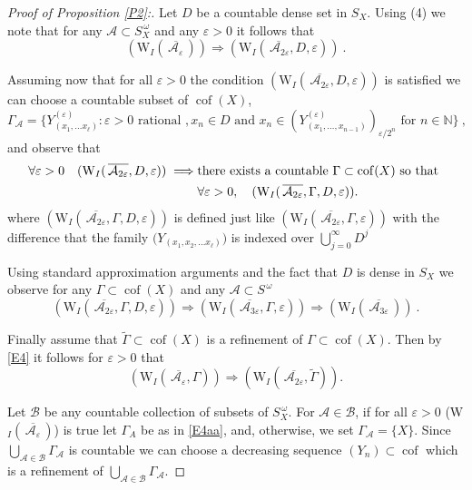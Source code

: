 \documentclass[11pt,leqno]{amsart}
\theoremstyle{definition}
\newcommand{\vp}{\varepsilon}
\newcommand{\cof}{\operatorname{cof}}
\newcommand{\cA}{\mathcal{A}}
\newcommand{\cB}{\mathcal{B}}
\newcommand{\bcAvp}{\overline{\mathcal{A_\vp}}}
\newcommand{\N}{\mathbb{N}}
\begin{document}
\begin{proof}[Proof of Proposition \ref{P2}:] 
Let $D$ be a countable dense set in $S_X$.
Using (4) we note that for any
$\cA\subset S^{\,\omega}_X$  and  any $\vp>0$ it follows that 
\begin{equation}\label{E4a}
(\text{W}_I(\,\bcAvp\,))\Rightarrow
(\text{W}_I(\overline{\,\cA_{2\vp}},D,\vp))\ .
\end{equation}
  
Assuming now that for all $\vp>0$ the condition 
$(\text{W}_I(\,\overline{\cA_{2\vp}},D,\vp))$ 
is satisfied we can choose a countable subset of $\cof (X)$,  
\begin{equation}\label{E4aa}
\Gamma_\cA=\big\{ Y^{(\vp)}_{(x_1,\ldots x_\ell)} : 
\vp>0\text{ rational },x_n\in D\text{ and } x_n\in 
(Y_{(x_1,\ldots,x_{n-1})}^{(\vp)})_{\vp/2^n}
\text{ for } n\in\N\bigr\}\ , 
\end{equation}
and observe that 
\begin{align}\label{E4b}  
\forall\vp>0\quad (\text{W}_I(\,\overline{\cA_{2\vp}},D,\vp)) \implies 
 &\text{there exists a countable }
 \Gamma\subset\cof(X) \text{ so that }\\ 
 &\forall\vp>0,
\quad (\text{W}_I(\,\overline{\cA_{2\vp}},\Gamma,D,\vp)).\notag
\end{align} 
where $(\text{W}_I(\,\overline{\cA_{2\vp}},\Gamma,D,\vp))$ is defined just 
like   $(\text{W}_I(\,\overline{\cA_{2\vp}},\Gamma,\vp))$ with the
difference that the family $\bigl(Y_{(x_1,x_2,\ldots x_\ell)}\bigr)$ is indexed
over $\bigcup_{j=0}^\infty D^j$
   
Using standard approximation arguments and the fact that 
$D$ is dense in $S_X$ we observe for
any $\Gamma\subset\cof(X)$ and any  $\cA\subset S^{\,\omega}$
\begin{equation}\label{E4c}
(\text{W}_I(\,\overline{\cA_{2\vp}},\Gamma,D,\vp))
\Rightarrow (\text{W}_I(\,\overline{\cA_{3\vp}},\Gamma,\vp))
\Rightarrow(\text{W}_I(\,\overline{\cA_{3\vp}}\,))\ .
\end{equation}
    
Finally assume that $\tilde\Gamma \subset \cof(X)$ is a  refinement 
of $\Gamma\subset\cof(X)$.
Then by \eqref{E4} it follows for $\vp>0$ that
\begin{equation}\label{E4d}
(\text{W}_I(\,\bcAvp,\Gamma))\Rightarrow (\text{W}_I
(\,\overline{\cA_{2\vp}},\tilde\Gamma)).
\end{equation}
     
Let $\cB$ be any countable collection of subsets of $S_X^{\,\omega}$. 
For $\cA\in\cB$, if for all $\vp>0$ (W$_I(\,\bcAvp\,)$) is true let $\Gamma_A$ 
be as in \eqref{E4aa}, and, otherwise, we set $\Gamma_{\cA}=\{X\}$. 
Since $\bigcup_{\cA\in\cB}\Gamma_{\cA}$ is countable we can choose
a decreasing sequence $(Y_n)\subset\cof$ which is a refinement of 
$\bigcup_{\cA\in\cB}\Gamma_{\cA}$.
      

\end{proof}
\end{document}
